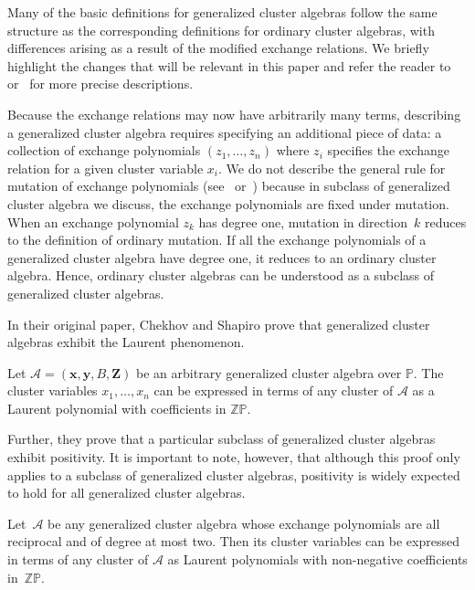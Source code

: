 Many of the basic definitions for generalized cluster algebras follow the same structure as the corresponding definitions for ordinary cluster algebras, with differences arising as a result of the modified exchange relations. We briefly highlight the changes that will be relevant in this paper and refer the reader to~\cite{Chekhov-Shapiro} or~\cite{Nakanishi} for more precise descriptions.

Because the exchange relations may now have arbitrarily many terms, describing a generalized cluster algebra requires specifying an additional piece of data: a collection of exchange polynomials $(z_1,\dots,z_n)$ where $z_i$ specifies the exchange relation for a given cluster variable $x_i$. We do not describe the general rule for mutation of exchange polynomials (see~\cite{Chekhov-Shapiro} or~\cite{Nakanishi}) because in subclass of generalized cluster algebra we discuss, the exchange polynomials are fixed under mutation. When an exchange polynomial $z_k$ has degree one, mutation in direction~$k$ reduces to the definition of ordinary mutation. If all the exchange polynomials of a generalized cluster algebra have degree one, it reduces to an ordinary cluster algebra. Hence, ordinary cluster algebras can be understood as a subclass of generalized cluster algebras.

In their original paper, Chekhov and Shapiro prove that generalized cluster algebras exhibit the Laurent phenomenon.

\begin{Theorem}
\label{CS-LP}
Let $\mathcal{A} = (\mathbf{x}, \mathbf{y}, B, \mathbf{Z})$ be an arbitrary generalized cluster algebra over $\mathbb{P}$. The cluster variables $x_1, \dots, x_n$ can be expressed in terms of any cluster of $\mathcal{A}$ as a Laurent polynomial with coefficients in $\mathbb{ZP}$.
\end{Theorem}

Further, they prove that a particular subclass of generalized cluster algebras exhibit positivity. It is important to note, however, that although this proof only applies to a subclass of generalized cluster algebras, positivity is widely expected to hold for all generalized cluster algebras.

\begin{Theorem}\label{CS-reciprocalDeg2}
Let~$\mathcal{A}$ be any generalized cluster algebra whose exchange polynomials are all reciprocal and of degree at most two. Then its cluster variables can be expressed in terms of any cluster of $\mathcal{A}$ as Laurent polynomials with non-negative coefficients in~$\mathbb{ZP}$.
\end{Theorem}

